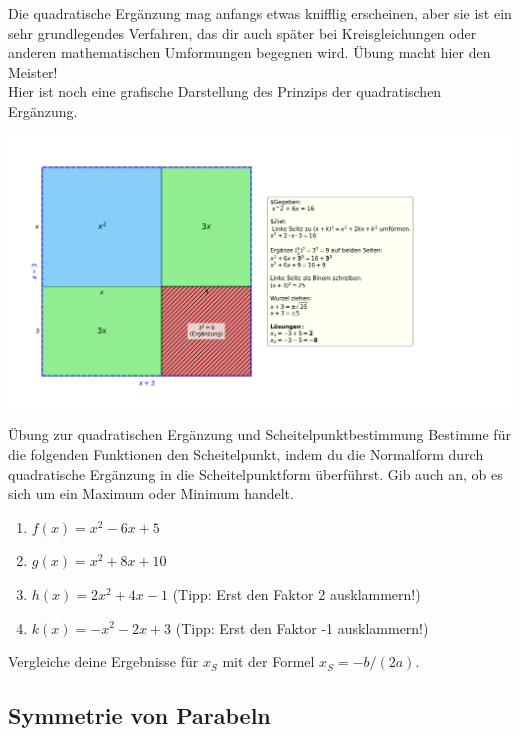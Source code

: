 \newpage
Die quadratische Ergänzung mag anfangs etwas knifflig erscheinen, aber sie ist ein sehr grundlegendes Verfahren, das dir auch später bei Kreisgleichungen oder anderen mathematischen Umformungen begegnen wird. Übung macht hier den Meister!\\
Hier ist noch eine grafische Darstellung des Prinzips der quadratischen Ergänzung. 
\begin{center}
    \includegraphics[scale = 0.5]{grafiken/Quadratische_Ergaenzung_Visualisierung.png}
    \label{fig:quad_ergaenzung_visual}
\end{center}


\begin{aufgabenumgebung}{Übung zur quadratischen Ergänzung und Scheitelpunktbestimmung}
Bestimme für die folgenden Funktionen den Scheitelpunkt, indem du die Normalform durch quadratische Ergänzung in die Scheitelpunktform überführst. Gib auch an, ob es sich um ein Maximum oder Minimum handelt.
\begin{enumerate}
    \item $f(x) = x^2 - 6x + 5$
    \item $g(x) = x^2 + 8x + 10$
    \item $h(x) = 2x^2 + 4x - 1$ (Tipp: Erst den Faktor 2 ausklammern!)
    \item $k(x) = -x^2 - 2x + 3$ (Tipp: Erst den Faktor -1 ausklammern!)
\end{enumerate}
Vergleiche deine Ergebnisse für $x_S$ mit der Formel $x_S = -b/(2a)$.
\end{aufgabenumgebung}

\subsection{Symmetrie von Parabeln}
\label{subsec:symmetrie_parabeln}

